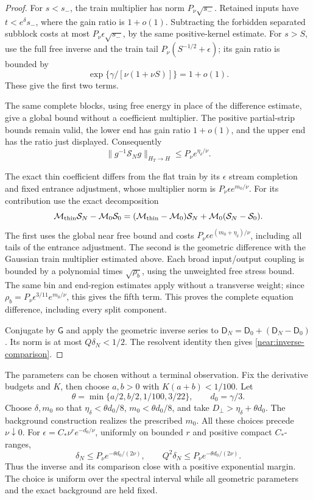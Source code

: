 \begin{proof}
For \(s<s_-\), the train multiplier has norm \(P_\nu\sqrt{s_-}\).
Retained inputs have \(t<e^\delta s_-\), where the gain ratio
is \(1+o(1)\). Subtracting the forbidden separated subblock costs
at most \(P_\nu\epsilon\sqrt{s_-}\), by the same positive-kernel
estimate. For \(s>S\), use the full free inverse and the train tail
\(P_\nu(S^{-1/2}+\epsilon)\); its gain ratio is bounded by
\[
 \exp\{\gamma/[\nu(1+\nu S)]\}=1+o(1).
\]
These give the first two terms.

The same complete blocks, using free energy in place of the difference
estimate, give a global bound without a coefficient multiplier. The
positive partial-strip bounds remain valid, the lower end has gain
ratio \(1+o(1)\), and the upper end has the ratio just displayed.
Consequently
\begin{equation}\label{near:masked-free-bound}
 \|g^{-1}\mathcal S_N g\|_{H_T\to H}
       \le P_\nu e^{\eta_\delta/\nu}.
\end{equation}

The exact thin coefficient differs from the flat train by its
\(\epsilon\) stream completion and fixed entrance adjustment,
whose multiplier norm is \(P_\nu\epsilon e^{m_0/\nu}\).
For its contribution use the exact decomposition
\[
 \mathcal M_{\rm thin}\mathcal S_N-\mathcal M_0\mathcal S_0
 = (\mathcal M_{\rm thin}-\mathcal M_0)\mathcal S_N
       +\mathcal M_0(\mathcal S_N-\mathcal S_0).
\]
The first uses the global near free bound and costs
\(P_\nu\epsilon e^{(m_0+\eta_\delta)/\nu}\), including
all tails of the entrance adjustment. The second is the geometric
difference with the Gaussian train multiplier estimated above.
Each broad input/output coupling is bounded by a polynomial times
\(\sqrt{\rho_b}\), using the unweighted free stress bound.
The same bin and end-region estimates apply without a transverse
weight; since \(\rho_b=P_\nu\epsilon^{3/11}e^{m_0/\nu}\),
this gives the fifth term. This proves the complete equation
difference, including every split component.

Conjugate by \(\mathsf G\) and apply the geometric inverse series
to \(\mathsf D_N=\mathsf D_0+(\mathsf D_N-\mathsf D_0)\).
Its norm is at most \(Q\delta_N<1/2\).
The resolvent identity then gives \eqref{near:inverse-comparison}.
\end{proof}

The parameters can be chosen without a terminal observation. Fix the
derivative budgets and \(K\), then choose \(a,b>0\) with
\(K(a+b)<1/100\). Let
\[
 \theta=\min\{a/2,b/2,1/100,3/22\},\qquad d_0=\gamma/3.
\]
Choose \(\delta,m_0\) so that
\(\eta_\delta<\theta d_0/8\),
\(m_0<\theta d_0/8\), and take
\(D_\perp>\eta_\delta+\theta d_0\).
The background construction realizes the prescribed \(m_0\).
All these choices precede \(\nu\downarrow0\).
For \(\epsilon=C_*\nu^r e^{-d_0/\nu}\), uniformly on bounded
\(r\) and positive compact \(C_*\)-ranges,
\[
 \delta_N\le P_\nu e^{-\theta d_0/(2\nu)},\qquad
 Q^2\delta_N\le P_\nu e^{-\theta d_0/(2\nu)}.
\]
Thus the inverse and its comparison close with a positive exponential
margin. The choice is uniform over the spectral interval while all
geometric parameters and the exact background are held fixed.

